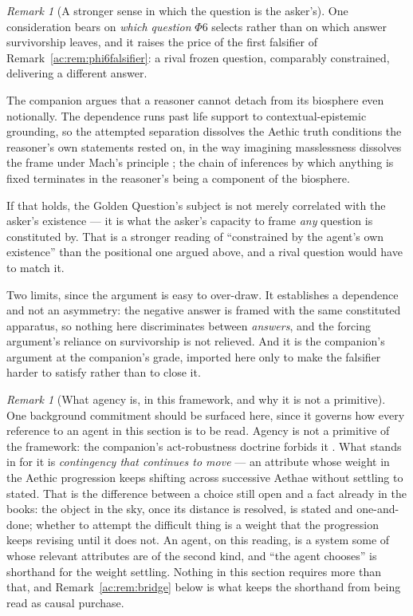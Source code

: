 \documentclass[11pt]{article}
\numberwithin{equation}{section}
\theoremstyle{plain}
\theoremstyle{definition}
\theoremstyle{remark}
\newtheorem{remark}[theorem]{Remark}
\begin{document}
\begin{remark}[A stronger sense in which the question is the asker's]
\label{ac:rem:indecomposable}
One consideration bears on \emph{which question} $\Phi6$ selects rather
than on which answer survivorship leaves, and it raises the price of the
first falsifier of Remark~\ref{ac:rem:phi6falsifier}: a rival frozen
question, comparably constrained, delivering a different answer.

The companion argues that a reasoner cannot detach from its biosphere
even notionally. The dependence runs past life support to
contextual-epistemic grounding, so the attempted separation dissolves the
Aethic truth conditions the reasoner's own statements rested on, in the
way imagining masslessness dissolves the frame under Mach's principle
\cite{Nexus, Barbour1995}; the chain of inferences by which anything is
fixed terminates in the reasoner's being a component of the biosphere.

If that holds, the Golden Question's subject is not merely correlated
with the asker's existence --- it is what the asker's capacity to frame
\emph{any} question is constituted by. That is a stronger reading of
``constrained by the agent's own existence'' than the positional one
argued above, and a rival question would have to match it.

Two limits, since the argument is easy to over-draw. It establishes a
dependence and not an asymmetry: the negative answer is framed with the
same constituted apparatus, so nothing here discriminates between
\emph{answers}, and the forcing argument's reliance on survivorship is
not relieved. And it is the companion's argument at the companion's
grade, imported here only to make the falsifier harder to satisfy rather
than to close it.
\end{remark}

\begin{remark}[What agency is, in this framework, and why it is not a
primitive]\label{ac:rem:agencyisnot}
One background commitment should be surfaced here, since it governs how
every reference to an agent in this section is to be read. Agency is not
a primitive of the framework: the companion's act-robustness doctrine
forbids it \cite{Aethus}. What stands in for it is \emph{contingency that
continues to move} --- an attribute whose weight in the Aethic
progression keeps shifting across successive Aethae without settling to
stated. That is the difference between a choice still open and a fact
already in the books: the object in the sky, once its distance is
resolved, is stated and one-and-done; whether to attempt the difficult
thing is a weight that the progression keeps revising until it does not.
An agent, on this reading, is a system some of whose relevant attributes
are of the second kind, and ``the agent chooses'' is shorthand for the
weight settling. Nothing in this section requires more than that, and
Remark~\ref{ac:rem:bridge} below is what keeps the shorthand from being read
as causal purchase.
\end{remark}
\end{document}
